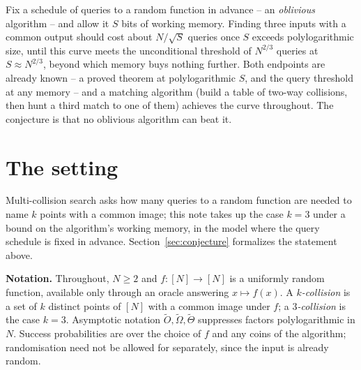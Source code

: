 \documentclass{conjura-conjecture}
\newcommand{\NN}{[N]}
\begin{document}

\vspace{0.4em}

\begin{informalconjecture}
Fix a schedule of queries to a random function in advance -- an \emph{oblivious} algorithm
-- and allow it $S$ bits of working memory. Finding three inputs with a common output should
cost about $N/\sqrt S$ queries once $S$ exceeds polylogarithmic size, until this curve meets
the unconditional threshold of $N^{2/3}$ queries at $S \approx N^{2/3}$, beyond which memory
buys nothing further. Both endpoints are already known -- a proved theorem at
polylogarithmic $S$, and the query threshold at any memory -- and a matching algorithm
(build a table of two-way collisions, then hunt a third match to one of them) achieves the
curve throughout. The conjecture is that no oblivious algorithm can beat it.
\end{informalconjecture}

\section{The setting}\label{sec:setting}

Multi-collision search asks how many queries to a random function are needed to name $k$
points with a common image; this note takes up the case $k = 3$ under a bound on the
algorithm's working memory, in the model where the query schedule is fixed in advance.
Section~\ref{sec:conjecture} formalizes the statement above.

\smallskip
\noindent\textbf{Notation.}
Throughout, $N \geq 2$ and $f \colon \NN \to \NN$ is a uniformly random function, available only
through an oracle answering $x \mapsto f(x)$.  A \emph{$k$-collision} is a set of $k$ distinct
points of $\NN$ with a common image under $f$; a \emph{$3$-collision} is the case $k = 3$.
Asymptotic notation $\tilde O, \tilde\Omega, \tilde\Theta$ suppresses factors polylogarithmic in
$N$.  Success probabilities are over the choice of $f$ and any coins of the algorithm;
randomisation need not be allowed for separately, since the input is already random.
\end{document}

